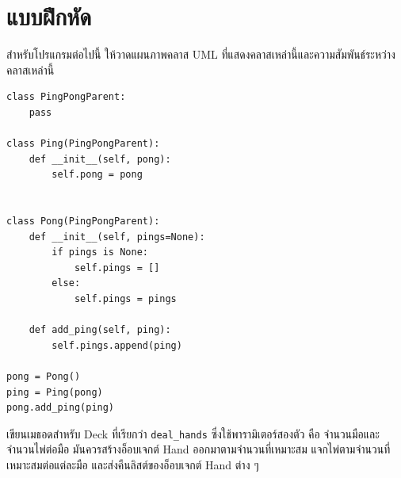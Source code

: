 \section{แบบฝึกหัด}


\begin{exercise}

สำหรับโปรแกรมต่อไปนี้ ให้วาดแผนภาพคลาส UML ที่แสดงคลาสเหล่านี้และความสัมพันธ์ระหว่างคลาสเหล่านี้

\begin{verbatim}
class PingPongParent:
    pass

class Ping(PingPongParent):
    def __init__(self, pong):
        self.pong = pong


class Pong(PingPongParent):
    def __init__(self, pings=None):
        if pings is None:
            self.pings = []
        else:
            self.pings = pings

    def add_ping(self, ping):
        self.pings.append(ping)

pong = Pong()
ping = Ping(pong)
pong.add_ping(ping)
\end{verbatim}


\end{exercise}



\begin{exercise}

เขียนเมธอดสำหรับ Deck ที่เรียกว่า \verb"deal_hands" ซึ่งใช้พารามิเตอร์สองตัว คือ 
จำนวนมือและจำนวนไพ่ต่อมือ มันควรสร้างอ็อบเจกต์ Hand ออกมาตามจำนวนที่เหมาะสม แจกไพ่ตามจำนวนที่เหมาะสมต่อแต่ละมือ และส่งคืนลิสต์ของอ็อบเจกต์ Hand ต่าง ๆ

\end{exercise}


